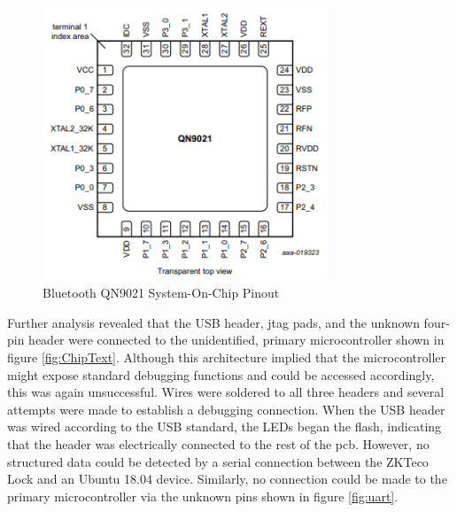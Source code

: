 \documentclass[conference]{IEEEtran}
\begin{document}
\begin{figure}[ht]
  \includegraphics[width=8.5cm]{images/BlueToothChip.png}
  \caption{Bluetooth QN9021 System-On-Chip Pinout}
  \label{fig:blepinout}
\end{figure}

Further analysis revealed that the USB header, \gls{jtag} pads, and the unknown four-pin header were connected to the unidentified, primary microcontroller shown in figure \ref{fig:ChipText}. Although this architecture implied that the microcontroller might expose standard debugging functions and could be accessed accordingly, this was again unsuccessful. Wires were soldered to all three headers and several attempts were made to establish a debugging connection. When the USB header was wired according to the USB standard, the LEDs began the flash, indicating that the header was electrically connected to the rest of the \gls{pcb}. However, no structured data could be detected by a serial connection between the ZKTeco Lock and an Ubuntu 18.04 device. Similarly, no connection could be made to the primary microcontroller via the unknown pins shown in figure \ref{fig:uart}.
\end{document}
